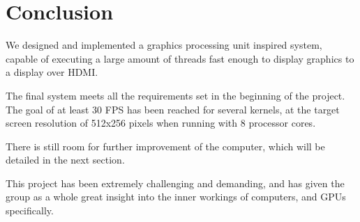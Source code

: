 \documentclass[../main/report.tex]{subfiles}
\begin{document}
\chapter{Conclusion}

We designed and implemented a graphics processing unit inspired system,
capable of executing a large amount of threads fast enough to display graphics to a display over HDMI.

The final system meets all the requirements set in the beginning of the project.
The goal of at least 30 FPS has been reached for several kernels,
at the target screen resolution of 512x256 pixels when running with 8 processor cores.

There is still room for further improvement of the computer, which will be detailed in the next section.

This project has been extremely challenging and demanding,
and has given the group as a whole great insight into the inner workings of computers,
and GPUs specifically.
\end{document}
